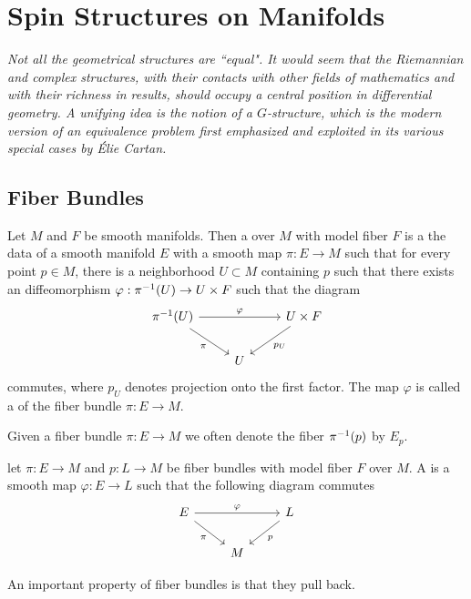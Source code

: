 \chapter{Spin Structures on Manifolds}
%
\subsectionend $ $\\
%
\emph{Not all the geometrical structures are ``equal". It would seem that the
Riemannian and complex structures, with their contacts with other fields of
mathematics and with their richness in results, should occupy a central position
in differential geometry. A unifying idea is the notion of a $G$-structure, which
is the modern version of an equivalence problem first emphasized and exploited
in its various special cases by \'Elie Cartan.} \\
%
%
\subsectionend
%
\section{Fiber Bundles}
%
\begin{defn}
Let $M$ and $F$ be smooth manifolds. Then a  over $M$ with
model fiber $F$ is a the data of a smooth manifold $E$ with a smooth map
$\pi : E \to M$ such that for every point $p \in M$, there is a neighborhood
$U \subset M$ containing $p$ such that there exists an diffeomorphism
$\varphi : \pi^{-1}(U) \to U \times F$ such that the diagram
\[\begin{tikzcd}
\pi\inv(U) \ar[rr, "\varphi"] \ar[dr, "\pi"']&& U \times F \ar[dl, "p_U"] \\
& U
\end{tikzcd}\]
commutes, where $p_U$ denotes projection onto the first factor. The map $\varphi$ is
called a  of the fiber bundle $\pi : E \to M$.
\end{defn}
%
Given a fiber bundle $\pi : E \to M$ we often denote the fiber $\pi^{-1}(p)$
by $E_p$.
%
\begin{defn}
let $\pi : E \to M$ and $p : L \to M$ be fiber bundles with model fiber $F$
over $M$. A  is a smooth map $\varphi : E \to L$ such
that the following diagram commutes
\[\begin{tikzcd}
E \ar[dr, "\pi"']\ar[rr,"\varphi"] & & L \ar[dl, "p"] \\
& M
\end{tikzcd}\]
\end{defn}
%
An important property of fiber bundles is that they pull back.
